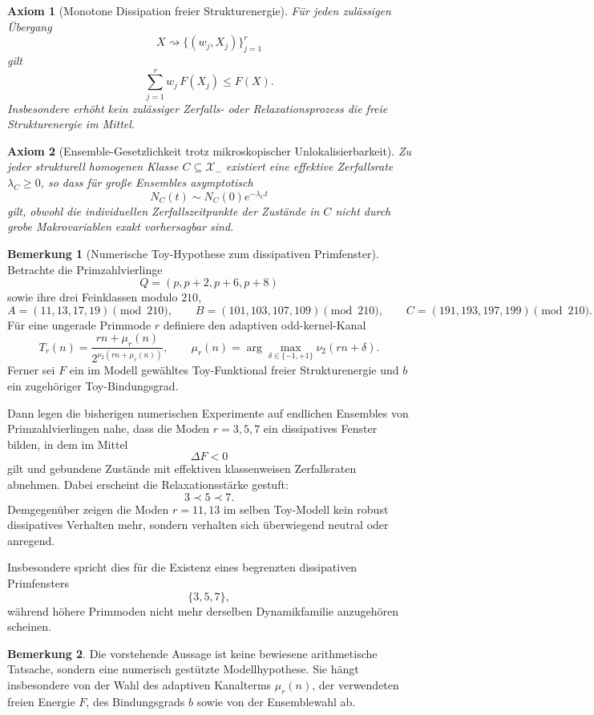 \documentclass[11pt,a4paper]{article}
\newtheorem{axiom}{Axiom}
\theoremstyle{definition}
\newtheorem{bemerkung}{Bemerkung}
\begin{document}
\begin{axiom}[Monotone Dissipation freier Strukturenergie]
	Für jeden zulässigen Übergang
	\[
	X \rightsquigarrow \{(w_j,X_j)\}_{j=1}^r
	\]
	gilt
	\[
	\sum_{j=1}^r w_j\,F(X_j)\le F(X).
	\]
	Insbesondere erhöht kein zulässiger Zerfalls- oder Relaxationsprozess die freie Strukturenergie im Mittel.
\end{axiom}

\begin{axiom}[Ensemble-Gesetzlichkeit trotz mikroskopischer Unlokalisierbarkeit]
	Zu jeder strukturell homogenen Klasse $C\subseteq\mathcal{X}_-$ existiert eine effektive Zerfallsrate $\lambda_C\ge 0$, so dass für große Ensembles asymptotisch
	\[
	N_C(t)\sim N_C(0)e^{-\lambda_C t}
	\]
	gilt, obwohl die individuellen Zerfallszeitpunkte der Zustände in $C$ nicht durch grobe Makrovariablen exakt vorhersagbar sind.
\end{axiom}

\begin{bemerkung}[Numerische Toy-Hypothese zum dissipativen Primfenster]
	Betrachte die Primzahlvierlinge
	\[
	Q=(p,p+2,p+6,p+8)
	\]
	sowie ihre drei Feinklassen modulo \(210\),
	\[
	A=(11,13,17,19)\!\!\!\pmod{210},\qquad
	B=(101,103,107,109)\!\!\!\pmod{210},\qquad
	C=(191,193,197,199)\!\!\!\pmod{210}.
	\]
	Für eine ungerade Primmode \(r\) definiere den adaptiven odd-kernel-Kanal
	\[
	T_r(n)=\frac{rn+\mu_r(n)}{2^{\nu_2(rn+\mu_r(n))}},
	\qquad
	\mu_r(n)=\arg\max_{\delta\in\{-1,+1\}}\nu_2(rn+\delta).
	\]
	Ferner sei \(F\) ein im Modell gewähltes Toy-Funktional freier Strukturenergie und \(b\) ein zugehöriger Toy-Bindungsgrad.
	
	Dann legen die bisherigen numerischen Experimente auf endlichen Ensembles von Primzahlvierlingen nahe, dass die Moden \(r=3,5,7\) ein dissipatives Fenster bilden, in dem im Mittel
	\[
	\Delta F<0
	\]
	gilt und gebundene Zustände mit effektiven klassenweisen Zerfallsraten abnehmen. Dabei erscheint die Relaxationsstärke gestuft:
	\[
	3 \prec 5 \prec 7.
	\]
	Demgegenüber zeigen die Moden \(r=11,13\) im selben Toy-Modell kein robust dissipatives Verhalten mehr, sondern verhalten sich überwiegend neutral oder anregend.
	
	Insbesondere spricht dies für die Existenz eines begrenzten dissipativen Primfensters
	\[
	\{3,5,7\},
	\]
	während höhere Primmoden nicht mehr derselben Dynamikfamilie anzugehören scheinen.
\end{bemerkung}

\begin{bemerkung}
	Die vorstehende Aussage ist keine bewiesene arithmetische Tatsache, sondern eine numerisch gestützte Modellhypothese. Sie hängt insbesondere von der Wahl des adaptiven Kanalterms \(\mu_r(n)\), der verwendeten freien Energie \(F\), des Bindungsgrads \(b\) sowie von der Ensemblewahl ab.
\end{bemerkung}
\end{document}
